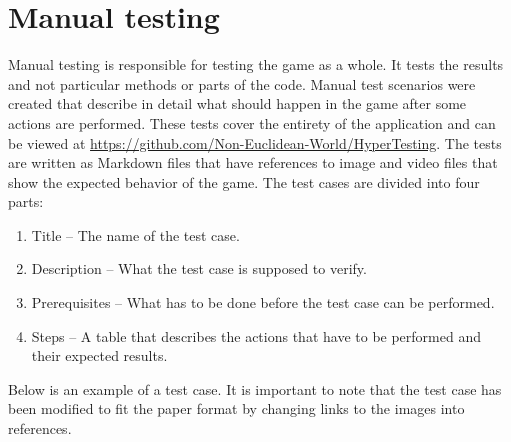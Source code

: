 \section{Manual testing} \label{sec:manual_testing}
Manual testing is responsible for testing the game as a whole.
It tests the results and not particular methods or parts of the code.
Manual test scenarios were created that describe in detail what should happen in the game after some actions are performed.
These tests cover the entirety of the application and can be viewed at \url{https://github.com/Non-Euclidean-World/HyperTesting}.
The tests are written as Markdown files that have references to image and video files that show the expected behavior of the game.
The test cases are divided into four parts:
\begin{enumerate}
  \item Title -- The name of the test case.
  \item Description -- What the test case is supposed to verify.
  \item Prerequisites -- What has to be done before the test case can be performed.
  \item Steps -- A table that describes the actions that have to be performed and their expected results.
\end{enumerate}

Below is an example of a test case.
It is important to note that the test case has been modified to fit the paper format by changing links to the images into references.

